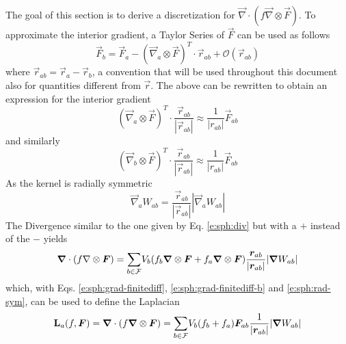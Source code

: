 \documentclass{../GPUSPHtemplate}
\begin{document}
The goal of this section is to derive a discretization for $\vec{\nabla} \cdot (f
\vec{\nabla} \otimes \vec{F})$. To approximate the interior gradient, a
Taylor Series of $\vec{F}$ can be used as follows
\begin{equation}
\vec{F}_b = \vec{F}_a - (\vec{\nabla}_a \otimes \vec{F})^T \cdot
\vec{r}_{ab} + \mathcal{O}(\vec{r}_{ab})
\label{e:sph:taylor}
\end{equation}
where $\vec{r}_{ab} = \vec{r}_a - \vec{r}_b$, a convention that will
be used throughout this document also for quantities different from
$\vec{r}$.
The above can be rewritten to obtain an expression for the interior
gradient
\begin{equation}
(\vec{\nabla}_a \otimes \vec{F})^T \cdot
\frac{\vec{r}_{ab}}{|\vec{r}_{ab}|} \approx
\frac{1}{|r_{ab}|}\vec{F}_{ab}
\label{e:sph:grad-finitediff}
\end{equation}
and similarly
\begin{equation}
(\vec{\nabla}_b \otimes \vec{F})^T \cdot
\frac{\vec{r}_{ab}}{|\vec{r}_{ab}|} \approx
\frac{1}{|r_{ab}|}\vec{F}_{ab}
\label{e:sph:grad-finitediff-b}
\end{equation}
As the kernel is radially symmetric
\begin{equation}
\vec{\nabla}_a W_{ab} = \frac{\vec{r}_{ab}}{|\vec{r}_{ab}|} |\vec{\nabla}_a
W_{ab}|
\label{e:sph:rad-sym}
\end{equation}
The Divergence similar to the one given by Eq.
\eqref{e:sph:div} but with a $+$ instead of the $-$ yields
\begin{equation}
\bm{\nabla} \cdot (f \nabla \otimes \bm{F}) = \underset{b \in \mathcal{F}}{\sum} V_b (f_b \bm{\nabla}
\otimes \bm{F} + f_a \bm{\nabla} \otimes \bm{F})
\frac{\bm{r}_{ab}}{|\bm{r}_{ab}|} |\bm{\nabla} W_{ab}|
\end{equation}
which, with Eqs. \eqref{e:sph:grad-finitediff},
\eqref{e:sph:grad-finitediff-b} and \eqref{e:sph:rad-sym}, can be used to
define the Laplacian
\begin{equation}
\textbf{L}_a(f, \bm{F}) = \bm{\nabla} \cdot (f \bm{\nabla} \otimes \bm{F}) = \underset{b \in \mathcal{F}}{\sum}
V_b (f_b + f_a) \bm{F}_{ab} \frac{1}{|\bm{r}_{ab}|} |\bm{\nabla} W_{ab}|
\label{e:sph:lap}
\end{equation}
\end{document}
